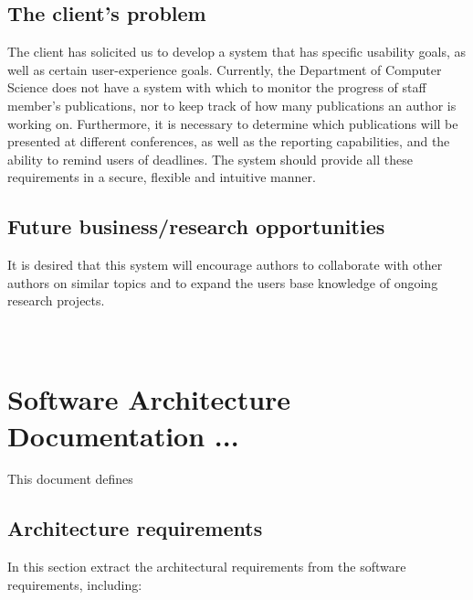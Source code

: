 \documentclass[a4paper]{article}
\begin{document}
	\subsection{The client's problem}
	The client has solicited us to develop a system that has specific usability goals, as well as certain user-experience goals. Currently, the Department of Computer Science does not have a system with which to monitor the progress of staff member's publications, nor to keep track of how many publications an author is working on. Furthermore, it is necessary to determine which publications will be presented at different conferences, as well as the reporting capabilities, and the ability to remind users of deadlines. The system should provide all these requirements in a secure, flexible and intuitive manner.
	
	
	\subsection{Future business/research opportunities}
	It is desired that this system will encourage authors to collaborate with other authors on similar topics and to expand the users base knowledge of ongoing research projects.
	\\
	\\
	\\
	
	\section{Software Architecture Documentation ...}
	
	This document defines 
	
	\subsection{Architecture requirements}
	In this section extract the architectural requirements from the software requirements, including:
	
\end{document}

